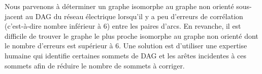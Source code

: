 Nous parvenons \`a d\'eterminer un graphe isomorphe au graphe non orient\'e sous-jacent au DAG du r\'eseau \'electrique lorsqu'il y a peu d'erreurs de corr\'elation (c'est-\`a-dire nombre inf\'erieur  \`a $6$) entre les paires d'arcs. En revanche, il est difficile de trouver le graphe le plus proche isomorphe au graphe non orient\'e dont le nombre d'erreurs est sup\'erieur \`a $6$. 
Une solution est d'utiliser une expertise humaine qui identifie certaines sommets de DAG et les ar\^etes incidentes \`a ces sommets afin de r\'eduire le nombre de sommets \`a corriger. 